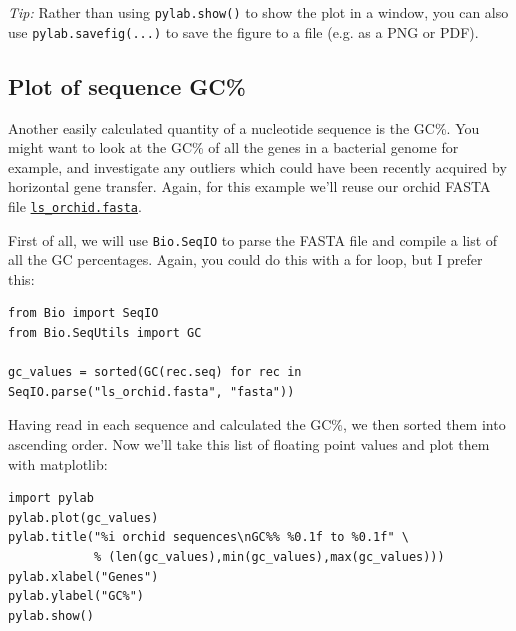 \documentclass{report}
\begin{document}
\emph{Tip:} Rather than using \verb|pylab.show()| to show the plot in a window, you can also use \verb|pylab.savefig(...)| to save the figure to a file (e.g. as a PNG or PDF).

\subsection{Plot of sequence GC\%}

Another easily calculated quantity of a nucleotide sequence is the GC\%.  You might
want to look at the GC\% of all the genes in a bacterial genome for example, and
investigate any outliers which could have been recently acquired by horizontal gene
transfer.  Again, for this example we'll reuse our orchid FASTA file \href{http://biopython.org/DIST/docs/tutorial/examples/ls_orchid.fasta}{\tt ls\_orchid.fasta}.

First of all, we will use \verb|Bio.SeqIO| to parse the FASTA file and compile a list
of all the GC percentages.  Again, you could do this with a for loop, but I prefer this:

\begin{verbatim}
from Bio import SeqIO
from Bio.SeqUtils import GC

gc_values = sorted(GC(rec.seq) for rec in SeqIO.parse("ls_orchid.fasta", "fasta"))
\end{verbatim}

Having read in each sequence and calculated the GC\%, we then sorted them into ascending
order. Now we'll take this list of floating point values and plot them with matplotlib:

\begin{verbatim}
import pylab
pylab.plot(gc_values)
pylab.title("%i orchid sequences\nGC%% %0.1f to %0.1f" \
            % (len(gc_values),min(gc_values),max(gc_values)))
pylab.xlabel("Genes")
pylab.ylabel("GC%")
pylab.show()
\end{verbatim}
\end{document}
